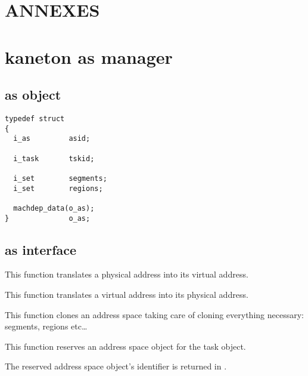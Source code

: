 \section*{ANNEXES}

\vspace{2cm}

\section*{kaneton as manager}

\subsection*{as object}

\begin{verbatim}
typedef struct
{
  i_as         asid;

  i_task       tskid;

  i_set        segments;
  i_set        regions;

  machdep_data(o_as);
}              o_as;
\end{verbatim}

\subsection*{as interface}

	 {
	   This function translates a physical address into its virtual
	   address.
	 }

	 {
	   This function translates a virtual address into its physical
	   address.
	 }

	 {
	   This function clones an address space taking care of cloning
	   everything necessary: segments, regions etc\ldots
	 }

	 {
	   This function reserves an address space object for the
	   task  object.

	   The reserved address space object's identifier is returned
	   in .
	 }

